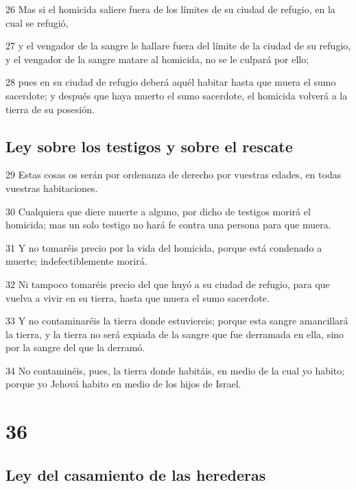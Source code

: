 \par 26 Mas si el homicida saliere fuera de los límites de su ciudad de refugio, en la cual se refugió,
\par 27 y el vengador de la sangre le hallare fuera del límite de la ciudad de su refugio, y el vengador de la sangre matare al homicida, no se le culpará por ello;
\par 28 pues en su ciudad de refugio deberá aquél habitar hasta que muera el sumo sacerdote; y después que haya muerto el sumo sacerdote, el homicida volverá a la tierra de su posesión.

\section*{Ley sobre los testigos y sobre el rescate}

\par 29 Estas cosas os serán por ordenanza de derecho por vuestras edades, en todas vuestras habitaciones.
\par 30 Cualquiera que diere muerte a alguno, por dicho de testigos morirá el homicida; mas un solo testigo no hará fe contra una persona para que muera.
\par 31 Y no tomaréis precio por la vida del homicida, porque está condenado a muerte; indefectiblemente morirá.
\par 32 Ni tampoco tomaréis precio del que huyó a su ciudad de refugio, para que vuelva a vivir en su tierra, hasta que muera el sumo sacerdote.
\par 33 Y no contaminaréis la tierra donde estuviereis; porque esta sangre amancillará la tierra, y la tierra no será expiada de la sangre que fue derramada en ella, sino por la sangre del que la derramó.
\par 34 No contaminéis, pues, la tierra donde habitáis, en medio de la cual yo habito; porque yo Jehová habito en medio de los hijos de Israel.

\chapter{36}

\section*{Ley del casamiento de las herederas}

